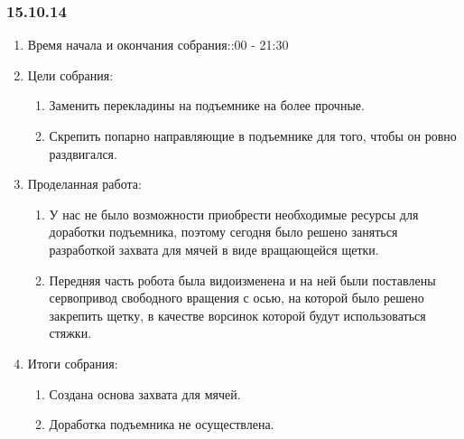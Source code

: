 
\subsubsection{15.10.14}

\begin{enumerate}
	\item Время начала и окончания собрания::00 - 21:30
	\item Цели собрания:\newline
	\begin{enumerate}
	  \item Заменить перекладины на подъемнике на более прочные.\newline
	  
	  \item Скрепить попарно направляющие в подъемнике для того, чтобы он ровно раздвигался.\newline
	  
    \end{enumerate}
    
	\item Проделанная работа:\newline
	\begin{enumerate}
	  \item У нас не было возможности приобрести необходимые ресурсы для доработки подъемника, поэтому сегодня было решено заняться разработкой захвата для мячей в виде вращающейся щетки.\newline
      
      \item  Передняя часть робота была видоизменена и на ней были поставлены сервопривод свободного вращения с осью, на которой было решено закрепить щетку, в качестве ворсинок которой будут использоваться стяжки.\newline
      
    \end{enumerate}
    
	\item Итоги собрания: \newline
	\begin{enumerate}
	  \item Создана основа захвата для мячей.\newline
	  
      \item Доработка подъемника не осуществлена.\newline
      

\end{enumerate}
\end{enumerate}
